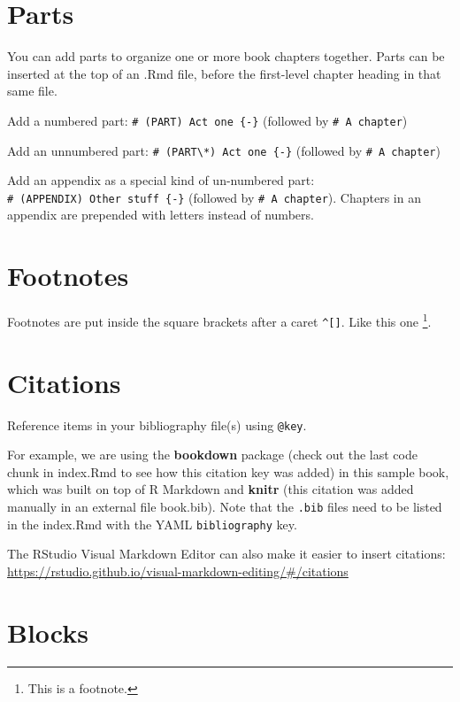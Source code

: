 \documentclass[
]{book}
\theoremstyle{definition}
\theoremstyle{definition}
\theoremstyle{definition}
\theoremstyle{definition}
\theoremstyle{remark}
\begin{document}
\section{Parts}\label{parts}

You can add parts to organize one or more book chapters together. Parts can be inserted at the top of an .Rmd file, before the first-level chapter heading in that same file.

Add a numbered part: \texttt{\#\ (PART)\ Act\ one\ \{-\}} (followed by \texttt{\#\ A\ chapter})

Add an unnumbered part: \texttt{\#\ (PART\textbackslash{}*)\ Act\ one\ \{-\}} (followed by \texttt{\#\ A\ chapter})

Add an appendix as a special kind of un-numbered part: \texttt{\#\ (APPENDIX)\ Other\ stuff\ \{-\}} (followed by \texttt{\#\ A\ chapter}). Chapters in an appendix are prepended with letters instead of numbers.

\section{Footnotes}\label{footnotes}

Footnotes are put inside the square brackets after a caret \texttt{\^{}{[}{]}}. Like this one \footnote{This is a footnote.}.

\section{Citations}\label{citations}

Reference items in your bibliography file(s) using \texttt{@key}.

For example, we are using the \textbf{bookdown} package \citep{R-bookdown} (check out the last code chunk in index.Rmd to see how this citation key was added) in this sample book, which was built on top of R Markdown and \textbf{knitr} \citep{xie2015} (this citation was added manually in an external file book.bib).
Note that the \texttt{.bib} files need to be listed in the index.Rmd with the YAML \texttt{bibliography} key.

The RStudio Visual Markdown Editor can also make it easier to insert citations: \url{https://rstudio.github.io/visual-markdown-editing/\#/citations}

\section{Blocks}\label{blocks}
\end{document}
